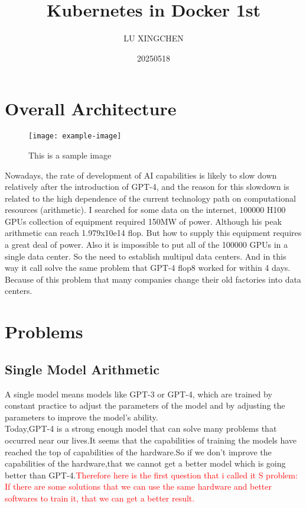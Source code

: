 \documentclass{article}
\title{\textbf{Kubernetes in Docker 1st}}
\author{LU XINGCHEN}
\date{20250518}
\begin{document}
\maketitle

\section{Overall Architecture}

\begin{figure}[htbp]
  \centering
  \texttt{[image: example-image]}  %
  \caption{This is a sample image}
  \label{fig:sample}
\end{figure}


\hspace{2em}
Nowadays, the rate of development of AI capabilities is likely to slow down relatively after the introduction of GPT-4, and the reason for this slowdown is related to the high dependence of the current technology path on computational resources (arithmetic).
I searched for some data on the internet, 100000 H100 GPUs collection of equipment required 150MW of power. Although his peak arithmetic can reach 1.979x10e14 flop. But how to supply this equipment requires a great deal of power. Also it is impossible to put all of the 100000 GPUs in a single data center. So the need to establish multipul data centers.  And in this way it call solve the same problem that GPT-4 flop8 worked for within 4 days. Because of this problem that many companies change their old factories into data centers.

\section{Problems}
\subsection{Single Model Arithmetic}
\hspace{2em}
A single model means models like GPT-3 or GPT-4, which are trained by constant practice to adjust the parameters of the model and by adjusting the parameters to improve the model's ability.
\\

Today,GPT-4 is a strong enough model that can solve many problems that occurred near our lives.It seems that the capabilities of training the models have reached the top of capabilities of the hardware.So if we don't improve the capabilities of the hardware,that we cannot get a better model which is going better than GPT-4.\textcolor{red}{Therefore here is the first question that i called it S problem: If there are some solutions that we can use the same hardware and better softwares to train it, that we can get a better result.}
\\
\end{document}
